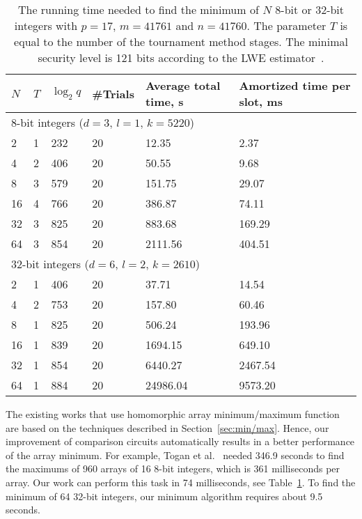 \begin{table}[h]
  \centering
  \begin{tabular*}{.45\textwidth}{ p{0.2cm} p{0.2cm} p{0.8cm} p{0.9cm} p{1.5cm} p{2.0cm}}
    \toprule
    $N$     & $T$   & $\log_2 q$    & \#Trials  & Average total time, s    & Amortized time per slot, ms \\
    \midrule
    \multicolumn{6}{l}{8-bit integers ($d=3$, $l=1$, $k=5220$)} \\
    \cmidrule(lr){1-6}
    2       & 1     & 232           & 20        & 12.35     & 2.37 \\
    4       & 2     & 406           & 20        & 50.55     & 9.68 \\
    8       & 3     & 579           & 20        & 151.75    & 29.07 \\
    16      & 4     & 766           & 20        & 386.87    & 74.11 \\
    32      & 3     & 825           & 20        & 883.68    & 169.29 \\
    64      & 3     & 854           & 20        & 2111.56   & 404.51 \\
    \midrule
    \multicolumn{6}{l}{32-bit integers ($d=6$, $l=2$, $k=2610$)} \\
    \cmidrule(lr){1-6}
    2       & 1     & 406           & 20        & 37.71     & 14.54 \\
    4       & 2     & 753           & 20        & 157.80    & 60.46 \\
    8       & 1     & 825           & 20        & 506.24    & 193.96 \\
    16      & 1     & 839           & 20        & 1694.15   & 649.10 \\
    32      & 1     & 854           & 20        & 6440.27   & 2467.54 \\
    64      & 1     & 884           & 20        & 24986.04  & 9573.20 \\
    \bottomrule
  \end{tabular*}
  \caption{The running time needed to find the minimum of $N$ 8-bit or 32-bit integers with $p=17$, $m=41761$ and $n=41760$. The parameter $T$ is equal to the number of the tournament method stages. The minimal security level is 121 bits according to the LWE estimator~\cite{lwe_estimator}.}
  \label{table:minimum_circuit_results}
\end{table}

The existing works that use homomorphic array minimum/maximum function~\cite{TMP15,PoPETS:SFR20} are based on the techniques described in Section~\ref{sec:min/max}.
Hence, our improvement of comparison circuits automatically results in a better performance of the array minimum.  
For example, Togan et al.~\cite{TMP15} needed 346.9 seconds to find the maximums of 960 arrays of 16 8-bit integers, which is 361 milliseconds per array.
Our work can perform this task in 74 milliseconds, see Table~\ref{table:minimum_circuit_results}.
To find the minimum of 64 32-bit integers, our minimum algorithm requires about 9.5 seconds.

